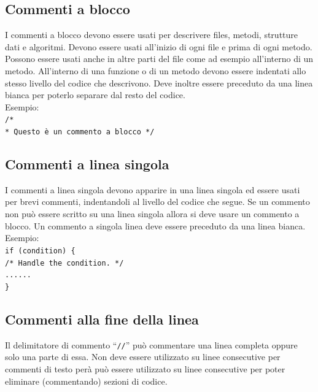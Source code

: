 \documentclass[11pt,titlepage,a4paper]{report}
\begin{document}
\subsection{Commenti a blocco}
I commenti a blocco devono essere usati per descrivere files, metodi, strutture dati e algoritmi. Devono essere usati all'inizio di ogni file e prima
di ogni metodo. Possono essere usati anche in altre parti del file come ad esempio all'interno di un metodo. All'interno di una funzione o di un metodo devono essere indentati allo stesso livello del codice che descrivono. Deve inoltre essere preceduto da una linea bianca per poterlo separare dal resto del codice. \\
 \newline
Esempio: \\
\texttt{/* \\
* Questo è un commento a blocco \newline
 */ } \\
 \newline
\subsection{Commenti a linea singola}
I commenti a linea singola devono apparire in una linea singola ed essere usati per brevi commenti, indentandoli al livello del codice che segue. Se un commento non può essere scritto su una linea singola allora si deve usare un commento a blocco. Un commento a singola linea deve essere preceduto da una linea bianca. \\
 \newline
Esempio: \\
\texttt{if (condition) \{ \\
        /* Handle the condition. */ \\
        ...... \\
\}} \\
 \newline
\subsection{Commenti alla fine della linea}
Il delimitatore di commento ``\texttt{//}'' può commentare una linea completa oppure solo una parte di essa. Non deve essere utilizzato su linee consecutive per commenti di testo per\`a può essere utilizzato su linee consecutive per poter eliminare (commentando) sezioni di codice.
\end{document}

